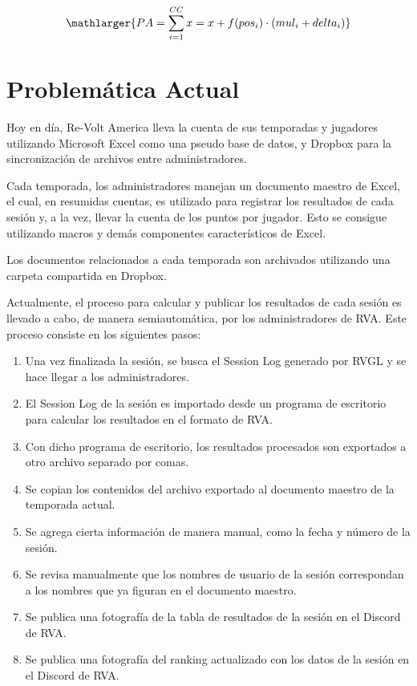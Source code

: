 \[
\mathlarger{{PA} = \sum_{i=1}^{CC}x=x+f(pos_i) \cdot \left(mul_i + delta_i\right)}
\]

\section{Problemática Actual}
Hoy en día, Re-Volt America lleva la cuenta de sus temporadas y jugadores utilizando Microsoft Excel como una pseudo base de datos, y Dropbox para la sincronización de archivos entre administradores.

Cada temporada, los administradores manejan un documento maestro de Excel, el cual, en resumidas cuentas, es utilizado para registrar los resultados de cada sesión y, a la vez, llevar la cuenta de los puntos por jugador. Esto se consigue utilizando macros y demás componentes característicos de Excel.

Los documentos relacionados a cada temporada son archivados utilizando una carpeta compartida en Dropbox.

Actualmente, el proceso para calcular y publicar los resultados de cada sesión es llevado a cabo, de manera semiautomática, por los administradores de RVA. Este proceso consiste en los siguientes pasos:

\begin{enumerate}
	\item Una vez finalizada la sesión, se busca el Session Log generado por RVGL y se hace llegar a los administradores.
	\item El Session Log de la sesión es importado desde un programa de escritorio para calcular los resultados en el formato de RVA.
	\item Con dicho programa de escritorio, los resultados procesados son exportados a otro archivo separado por comas.
	\item Se copian los contenidos del archivo exportado al documento maestro de la temporada actual.
	\item Se agrega cierta información de manera manual, como la fecha y número de la sesión.
	\item Se revisa manualmente que los nombres de usuario de la sesión correspondan a los nombres que ya figuran en el documento maestro.
	\item Se publica una fotografía de la tabla de resultados de la sesión en el Discord de RVA.
	\item Se publica una fotografía del ranking actualizado con los datos de la sesión en el Discord de RVA.
\end{enumerate}

